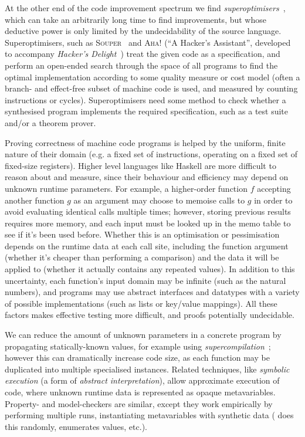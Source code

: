At the other end of the code improvement spectrum we find
\emph{superoptimisers}~\cite{massalin1987superoptimizer}, which can take an
arbitrarily long time to find improvements, but whose deductive power is only
limited by the undecidability of the source language. Superoptimisers, such as
\textsc{Souper}~\cite{sasnauskas2017souper} and \textsc{Aha!} (``A Hacker's
Assistant'', developed to accompany \emph{Hacker's
  Delight}~\cite{warren2013hacker}) treat the given code as a specification, and
perform an open-ended search through the space of all programs to find the
optimal implementation according to some quality measure or cost model (often a
branch- and effect-free subset of machine code is used, and measured by counting
instructions or cycles).  Superoptimisers need some method to check whether a
synthesised program implements the required specification, such as a test suite
and/or a theorem prover.

Proving correctness of machine code programs is helped by the uniform, finite
nature of their domain (e.g. a fixed set of instructions, operating on a fixed
set of fixed-size registers). Higher level languages like Haskell are more
difficult to reason about and measure, since their behaviour and efficiency may
depend on unknown runtime parameters. For example, a higher-order function $f$
accepting another function $g$ as an argument may choose to memoise calls to $g$
in order to avoid evaluating identical calls multiple times; however, storing
previous results requires more memory, and each input must be looked up in the
memo table to see if it's been used before. Whether this is an optimisation or
pessimisation depends on the runtime data at each call site, including the
function argument (whether it's cheaper than performing a comparison) and the
data it will be applied to (whether it actually contains any repeated values).
In addition to this uncertainty, each function's input domain may be infinite
(such as the natural numbers), and programs may use abstract interfaces and
datatypes with a variety of possible implementations (such as lists or key/value
mappings). All these factors makes effective testing more difficult, and proofs
potentially undecidable.

We can reduce the amount of unknown parameters in a concrete program by
propagating statically-known values, for example using
\emph{supercompilation}~\cite{Turchin:1986:CS:5956.5957}; however this can
dramatically increase code size, as each function may be duplicated into
multiple specialised instances. Related techniques, like \emph{symbolic
  execution} (a form of \emph{abstract interpretation}), allow approximate
execution of code, where unknown runtime data is represented as opaque
metavariables. Property- and model-checkers are similar, except they work
empirically by performing multiple runs, instantiating metavariables with
synthetic data (\quickcheck{} does this randomly, \smallcheck{} enumerates
values, etc.).

